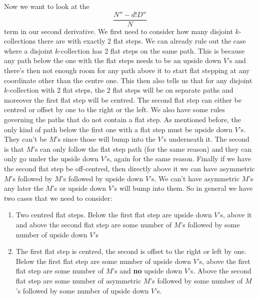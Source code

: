 \documentclass[11pt]{article}
\theoremstyle{definition}
\theoremstyle{definition}
\theoremstyle{plain}
\theoremstyle{plain}
\theoremstyle{plain}
\theoremstyle{definition}
\begin{document}
Now we want to look at the
\begin{equation*}
\frac{N''-d!D''}{N}
\end{equation*}
term in our second derivative. We first need to consider how many disjoint $k$-collections there are with exactly 2 flat steps. We can already rule out the case where a disjoint $k$-collection has 2 flat steps on the same path. This is because any path below the one with the flat steps needs to be an upside down $V$'s and there's then not enough room for any path above it to start flat stepping at any coordinate other than the centre one. This then also tells us that for any disjoint $k$-collection with 2 flat steps, the 2 flat steps will be on separate paths and moreover the first flat step will be centred. The second flat step can either be centred or offset by one to the right or the left. We also have some rules governing the paths that do not contain a flat step. As mentioned before, the only kind of path below the first one with a flat step must be upside down $V$'s. They can't be $M$'s since those will bump into the $V$'s underneath it. The second is that $M$'s can only follow the flat step path (for the same reason) and they can only go under the upside down $V$'s, again for the same reason. Finally if we have the second flat step be off-centred, then directly above it we can have asymmetric $M$'s followed by $M$'s followed by upside down $V$'s. We can't have asymmetric $M$'s any later the $M$'s or upside down $V$'s will bump into them. So in general we have two cases that we need to consider:

\begin{enumerate}[label=(\alph*)]
\item Two centred flat steps. Below the first flat step are upside down $V$'s, above it and above the second flat step are some number of $M$'s followed by some number of upside down $V$'s
\item The first flat step is centred, the second is offset to the right or left by one. Below the first flat step are some number of upside down $V$'s, above the first flat step are some number of $M$'s and \textbf{no} upside down $V$'s. Above the second flat step are some number of asymmetric $M$'s followed by some number of $M$'s followed by some number of upside down $V$'s.
\end{enumerate}
\end{document}
